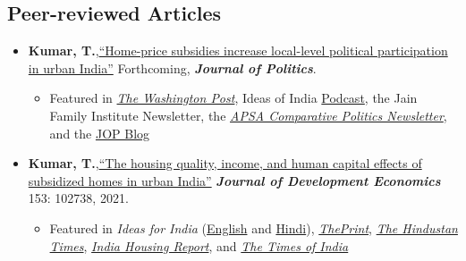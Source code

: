 \documentclass[11pt]{article}
\begin{document}
\subsection*{Peer-reviewed Articles}
\begin{itemize}
	



			\item[] \textbf{Kumar, T.},\href{https://doi.org/10.1086/715605}{``Home-price subsidies increase local-level political participation in urban India''} Forthcoming, \textit{\textbf{Journal of Politics}}.
			\begin{itemize}[nosep]
			\item Featured in \href{https://www.washingtonpost.com/news/monkey-cage/wp/2019/01/31/heres-what-gavin-newsom-elizabeth-warren-and-microsoft-should-know-if-want-to-end-the-affordable-housing-crisis/?tid=sm_tw_cage}{\textit{The Washington Post}},  Ideas of India \href{https://www.discoursemagazine.com/politics/2020/12/24/ideas-of-india-how-does-subsidizing-housing-prices-shape-political-behavior}{Podcast},  the Jain Family Institute Newsletter, the \href{https://www.comparativepoliticsnewsletter.org/wp-content/uploads/2020/05/Spring-Newsletter-2020.pdf}{\textit{APSA Comparative Politics Newsletter}}, and the \href{https://jop.blogs.uni-hamburg.de/home-price-subsidies-increase-local-level-political-participation-in-urban-india/}{JOP Blog}  			\end{itemize}
	
	
			\item[]\textbf{Kumar, T.},\href{https://doi.org/10.1016/j.jdeveco.2021.102738}{``The housing quality, income, and human capital effects of subsidized homes in urban India''} \textit{\textbf{Journal of Development Economics}} 153: 102738, 2021.
\begin{itemize}
	\item Featured in \textit{Ideas for India} (\href{https://www.ideasforindia.in/topics/poverty-inequality/household-level-effects-of-affordable-housing-evidence-from-mumbai.html}{English} and \href{https://www.ideasforindia.in/topics/poverty-inequality/household-level-effects-of-affordable-housing-evidence-from-mumbai-hindi.html}{Hindi}), \href{https://theprint.in/opinion/mumbai-residents-win-govt-housing-lottery-and-spend-more-on-kids-education-jobs-study/290485/}{\textit{ThePrint}}, \href{https://www.hindustantimes.com/opinion/housing-is-a-welfare-weapon-it-can-help-people-escape-poverty-101629993983576.html}{\textit{The Hindustan Times}}, \href{https://indiahousingreport.in/outputs/opinion/housing-is-a-welfare-weapon-it-can-help-people-escape-poverty/}{\textit{India Housing Report}}, and \href{https://timesofindia.indiatimes.com/city/mumbai/mhada-home-winners-see-upswing-in-family-edu-pay-in-mumbai-study/articleshow/86468320.cms}{\textit{The Times of India}}


\end{itemize}
\end{itemize}
\end{document}
